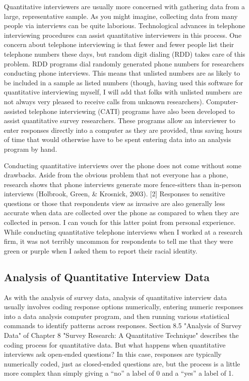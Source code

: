 Quantitative interviewers are usually more concerned with gathering data from a large, representative sample. As you might imagine, collecting data from many people via interviews can be quite laborious. Technological advances in telephone interviewing procedures can assist quantitative interviewers in this process. One concern about telephone interviewing is that fewer and fewer people list their telephone numbers these days, but random digit dialing (RDD) takes care of this problem. RDD programs dial randomly generated phone numbers for researchers conducting phone interviews. This means that unlisted numbers are as likely to be included in a sample as listed numbers (though, having used this software for quantitative interviewing myself, I will add that folks with unlisted numbers are not always very pleased to receive calls from unknown researchers). Computer-assisted telephone interviewing (CATI) programs have also been developed to assist quantitative survey researchers. These programs allow an interviewer to enter responses directly into a computer as they are provided, thus saving hours of time that would otherwise have to be spent entering data into an analysis program by hand.

Conducting quantitative interviews over the phone does not come without some drawbacks. Aside from the obvious problem that not everyone has a phone, research shows that phone interviews generate more fence-sitters than in-person interviews (Holbrook, Green, \& Krosnick, 2003). [2] Responses to sensitive questions or those that respondents view as invasive are also generally less accurate when data are collected over the phone as compared to when they are collected in person. I can vouch for this latter point from personal experience. While conducting quantitative telephone interviews when I worked at a research firm, it was not terribly uncommon for respondents to tell me that they were green or purple when I asked them to report their racial identity.

\subsection{Analysis of Quantitative Interview Data}

As with the analysis of survey data, analysis of quantitative interview data usually involves coding response options numerically, entering numeric responses into a data analysis computer program, and then running various statistical commands to identify patterns across responses. Section 8.5 "Analysis of Survey Data" of Chapter 8 "Survey Research: A Quantitative Technique" describes the coding process for quantitative data. But what happens when quantitative interviews ask open-ended questions? In this case, responses are typically numerically coded, just as closed-ended questions are, but the process is a little more complex than simply giving a “no” a label of 0 and a “yes” a label of 1.

